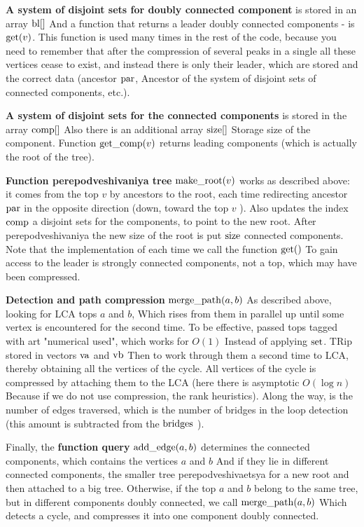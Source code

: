 \textbf{A system of disjoint sets for doubly connected component} is stored in an array ${\rm bl} []$ And a function that returns a leader doubly connected components - is ${\rm get} (v)$. This function is used many times in the rest of the code, because you need to remember that after the compression of several peaks in a single all these vertices cease to exist, and instead there is only their leader, which are stored and the correct data (ancestor ${\rm par}$, Ancestor of the system of disjoint sets of connected components, etc.).

\textbf{A system of disjoint sets for the connected components} is stored in the array ${\rm comp} []$ Also there is an additional array ${\rm size} []$ Storage size of the component. Function ${\rm get \_comp} (v)$ returns leading components (which is actually the root of the tree).

\textbf{Function perepodveshivaniya tree} ${\rm make \_root} (v)$ works as described above: it comes from the top $v$ by ancestors to the root, each time redirecting ancestor $\rm par$ in the opposite direction (down, toward the top $v$ ). Also updates the index ${\rm comp}$ a disjoint sets for the components, to point to the new root. After perepodveshivaniya the new size of the root is put ${\rm size}$ connected components. Note that the implementation of each time we call the function ${\rm get}()$ To gain access to the leader is strongly connected components, not a top, which may have been compressed.

\textbf{Detection and path compression} ${\rm merge \_path} (a, b)$ As described above, looking for LCA tops $a$ and $b$, Which rises from them in parallel up until some vertex is encountered for the second time. To be effective, passed tops tagged with art "numerical used", which works for $O (1)$ Instead of applying $\rm set$. TRip stored in vectors $\rm va$ and $\rm vb$ Then to work through them a second time to LCA, thereby obtaining all the vertices of the cycle. All vertices of the cycle is compressed by attaching them to the LCA (here there is asymptotic $O (\log n)$ Because if we do not use compression, the rank heuristics). Along the way, is the number of edges traversed, which is the number of bridges in the loop detection (this amount is subtracted from the $\rm bridges$ ).

Finally, the \textbf{function query} ${\rm add \_edge} (a, b)$ determines the connected components, which contains the vertices $a$ and $b$ And if they lie in different connected components, the smaller tree perepodveshivaetsya for a new root and then attached to a big tree. Otherwise, if the top $a$ and $b$ belong to the same tree, but in different components doubly connected, we call ${\rm merge \_path} (a, b)$ Which detects a cycle, and compresses it into one component doubly connected.

